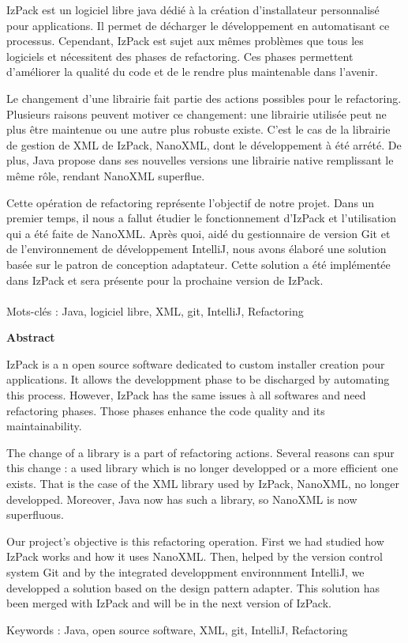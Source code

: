 IzPack est un logiciel libre java dédié à la création d'installateur personnalisé pour applications.
Il permet de décharger le développement en automatisant ce processus.
Cependant, IzPack est sujet aux mêmes problèmes que tous les logiciels et nécessitent des phases de refactoring.
Ces phases permettent d'améliorer la qualité du code et de le rendre plus maintenable dans l'avenir.

Le changement d'une librairie fait partie des actions possibles pour le refactoring.
Plusieurs raisons peuvent motiver ce changement: une librairie utilisée peut ne plus être maintenue ou une autre plus robuste existe.
C'est le cas de la librairie de gestion de XML de IzPack, NanoXML, dont le développement à été arrété.
De plus, Java propose dans ses nouvelles versions une librairie native remplissant le même rôle, rendant NanoXML superflue.

Cette opération de refactoring représente l'objectif de notre projet.
Dans un premier temps, il nous a fallut étudier le fonctionnement d'IzPack et l'utilisation qui a été faite de NanoXML.
Après quoi, aidé du gestionnaire de version Git et de l'environnement de développement IntelliJ, nous avons élaboré une solution basée sur le patron de conception adaptateur.
Cette solution a été implémentée dans IzPack et sera présente pour la prochaine version de IzPack.
~\\
~\\
Mots-clés : Java, logiciel libre, XML, git, IntelliJ, Refactoring
\vfill
\begin{center}\large{\textbf{Abstract}}\end{center}

IzPack is a n open source software dedicated to custom installer creation pour applications.
It allows the developpment phase to be discharged by automating this process.
However, IzPack has the same issues à all softwares and need refactoring phases.
Those phases enhance the code quality and its maintainability.

The change of a library is a part of refactoring actions.
Several reasons can spur this change : a used library which is no longer developped or a more efficient one exists.
That is the case of the XML library used by IzPack, NanoXML, no longer developped.
Moreover, Java now has such a library, so NanoXML is now superfluous.

Our project's objective is this refactoring operation.
First we had studied how IzPack works and how it uses NanoXML.
Then, helped by the version control system Git and by the integrated developpment environnment IntelliJ, we developped a solution based on the design pattern adapter.
This solution has been merged with IzPack and will be in the next version of IzPack.

Keywords : Java, open source software, XML, git, IntelliJ, Refactoring